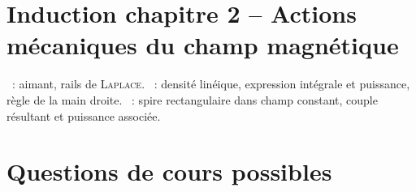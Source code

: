 \documentclass[a4paper, 11pt, final, garamond]{book}
\begin{document}
\section*{Induction chapitre 2 -- Actions mécaniques du champ magnétique}
\begin{enumerate}[label=\Roman*]
  ~: aimant, rails de \textsc{Laplace}.
  ~: densité linéique, expression intégrale et
  puissance, règle de la main droite.
  ~: spire rectangulaire dans champ constant,
  couple résultant et puissance associée.
\end{enumerate}

\section{Questions de cours possibles}
\end{document}
